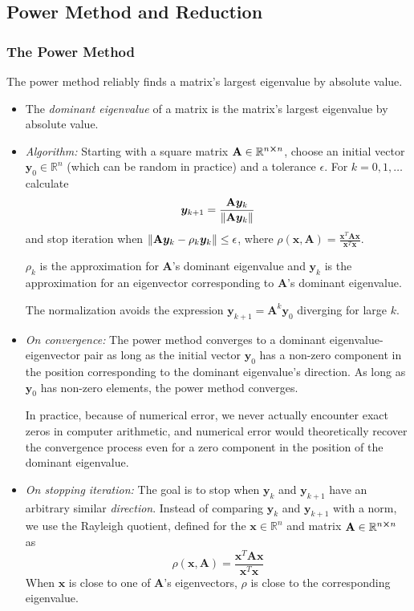 \documentclass[11pt, a4paper]{article}
\newcommand{\R}{\mathbb{R}} %
\newcommand{\mat}[1]{\mathbf{#1}} %
\begin{document}
\subsection{Power Method and Reduction}

\subsubsection{The Power Method}
The power method reliably finds a matrix's largest eigenvalue by absolute value.
\begin{itemize}
	\item The \textit{dominant eigenvalue} of a matrix is the matrix's largest eigenvalue by absolute value.

	\item \textit{Algorithm:} Starting with a square matrix $ \mat{A} \in \R^{n \cross n} $, choose an initial vector $ \bm{y}_0 \in \R^{n} $ (which can be random in practice) and a tolerance $ \epsilon $. For $ k = 0, 1, \dots $ calculate
	\begin{equation*}
	 	\bm{y}_{k+1} = \frac{\mat{A}\bm{y}_{k}}{\norm{\mat{A}\bm{y}_{k}}} 
	\end{equation*}
	and stop iteration when $ \norm{\mat{A} \bm{y}_{k} - \rho_k \bm{y}_k} \leq \epsilon $, where $ \rho(\bm{x}, \mat{A}) = \frac{\bm{x}^{T}\mat{A} \bm{x}}{\bm{x}^{T}\bm{x}} $. 
	
	$ \rho_k $ is the approximation for $ \mat{A} $'s dominant eigenvalue and $ \bm{y}_{k} $ is the approximation for an eigenvector corresponding to $ \mat{A} $'s dominant eigenvalue.
	
	The normalization avoids the expression $ \bm{y}_{k+1} = \mat{A}^{k}\bm{y}_{0} $ diverging for large $ k $.
	
	\item \textit{On convergence:} The power method converges to a dominant eigenvalue-eigenvector pair as long as the initial vector $ \bm{y}_{0} $ has a non-zero component in the position corresponding to the dominant eigenvalue's direction. As long as $ \bm{y}_{0} $ has non-zero elements, the power method converges.

	In practice, because of numerical error, we never actually encounter exact zeros in computer arithmetic, and numerical error would theoretically recover the convergence process even for a zero component in the position of the dominant eigenvalue.
	
	\item \textit{On stopping iteration:} The goal is to stop when $ \bm{y}_k $ and $ \bm{y}_{k+1} $ have an arbitrary similar \textit{direction}. Instead of comparing $ \bm{y}_k $ and $ \bm{y}_{k+1} $ with a norm, we use the Rayleigh quotient, defined for the $ \bm{x} \in \R^{n} $ and matrix $ \mat{A} \in \R^{n \cross n} $ as
	\begin{equation*}
		\rho(\bm{x}, \mat{A}) = \frac{\bm{x}^{T}\mat{A} \bm{x}}{\bm{x}^{T}\bm{x}}
	\end{equation*}
	When $ \bm{x} $ is close to one of $ \mat{A} $'s eigenvectors, $ \rho $ is close to the corresponding eigenvalue.
	

\end{itemize}
\end{document}

